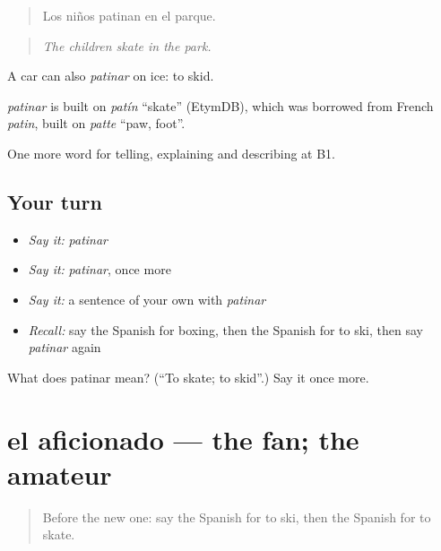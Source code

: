 \begin{quote}
Los niños patinan en el parque.
\end{quote}

\begin{quote}
\emph{The children skate in the park.}
\end{quote}

A car can also \emph{patinar} on ice: to skid.

\begin{cousinweb}
\emph{patinar} is built on \emph{patín} \textquotedblleft{}skate\textquotedblright{} (EtymDB), which was borrowed from French \emph{patin}, built on \emph{patte} \textquotedblleft{}paw, foot\textquotedblright{}.
\end{cousinweb}

\begin{grammarlens}[title={What you've built}]
One more word for telling, explaining and describing at B1.
\end{grammarlens}

\subsection*{Your turn}
\begin{itemize}
\raggedright
  \item \emph{Say it:} \emph{patinar}
  \item \emph{Say it:} \emph{patinar}, once more
  \item \emph{Say it:} a sentence of your own with \emph{patinar}
  \item \emph{Recall:} say the Spanish for boxing, then the Spanish for to ski, then say \emph{patinar} again
\end{itemize}

\begin{tcolorbox}[breakable,colback=teal!4,colframe=teal!35!black,title={Before you move on}]
What does patinar mean? (\textquotedblleft{}To skate; to skid\textquotedblright{}.) Say it once more.
\end{tcolorbox}
\section[el aficionado]{el aficionado — the fan; the amateur}

\label{lesson:ES-C758-aficionado}



\begin{quote}
Before the new one: say the Spanish for to ski, then the Spanish for to skate.
\end{quote}

